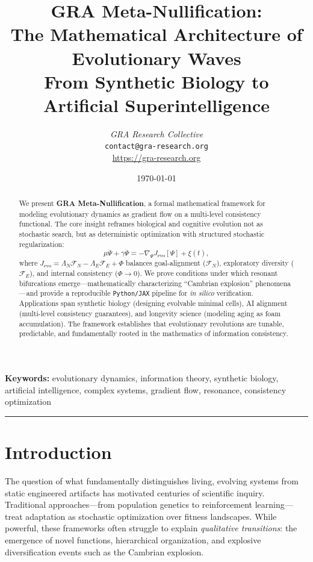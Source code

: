 \documentclass[11pt,a4paper]{article}
\title{
    \vspace{-2em}
    GRA Meta-Nullification: \\
    The Mathematical Architecture of Evolutionary Waves \\
    \large From Synthetic Biology to Artificial Superintelligence
}
\author{
    \textit{GRA Research Collective} \\
    \small \texttt{contact@gra-research.org} \\
    \small \url{https://gra-research.org}
}
\date{\today}
\theoremstyle{plain}
\theoremstyle{definition}
\theoremstyle{remark}
\newcommand{\grad}{\nabla}
\begin{document}
\maketitle
\thispagestyle{empty}

\begin{abstract}
\noindent
We present \textbf{GRA Meta-Nullification}, a formal mathematical framework for modeling evolutionary dynamics as gradient flow on a multi-level consistency functional. The core insight reframes biological and cognitive evolution not as stochastic search, but as deterministic optimization with structured stochastic regularization:
\[
\mu \ddot{\Psi} + \gamma \dot{\Psi} = -\grad_{\Psi} J_{\text{evo}}[\Psi] + \xi(t),
\]
where $J_{\text{evo}} = \Lambda_N \mathcal{F}_N - \Lambda_E \mathcal{F}_E + \Phi$ balances goal-alignment ($\mathcal{F}_N$), exploratory diversity ($\mathcal{F}_E$), and internal consistency ($\Phi \to 0$). We prove conditions under which resonant bifurcations emerge---mathematically characterizing ``Cambrian explosion'' phenomena---and provide a reproducible \texttt{Python/JAX} pipeline for \textit{in silico} verification. Applications span synthetic biology (designing evolvable minimal cells), AI alignment (multi-level consistency guarantees), and longevity science (modeling aging as foam accumulation). The framework establishes that evolutionary revolutions are tunable, predictable, and fundamentally rooted in the mathematics of information consistency.
\end{abstract}

\textbf{Keywords:} evolutionary dynamics, information theory, synthetic biology, artificial intelligence, complex systems, gradient flow, resonance, consistency optimization

\vspace{1em}
\hrule
\vspace{2em}

\tableofcontents
\vspace{2em}

\section{Introduction}

The question of what fundamentally distinguishes living, evolving systems from static engineered artifacts has motivated centuries of scientific inquiry. Traditional approaches---from population genetics to reinforcement learning---treat adaptation as stochastic optimization over fitness landscapes. While powerful, these frameworks often struggle to explain \textit{qualitative transitions}: the emergence of novel functions, hierarchical organization, and explosive diversification events such as the Cambrian explosion.
\end{document}
